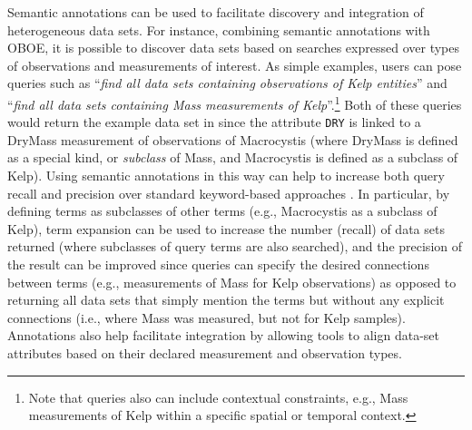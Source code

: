 Semantic annotations can be used to facilitate discovery and
integration of heterogeneous data sets. For instance, combining
semantic annotations with OBOE, it is possible to discover data sets
based on searches expressed over types of observations and
measurements of interest. As simple examples, users can pose queries
such as ``\emph{find all data sets containing observations of Kelp
  entities}'' and ``\emph{find all data sets containing Mass
  measurements of Kelp}''.\footnote{Note that queries also can include
  contextual constraints, e.g., Mass measurements of Kelp within a
  specific spatial or temporal context.} Both of these queries would
return the example data set in  since the
attribute {\tt DRY} is linked to a DryMass measurement of observations
of Macrocystis (where DryMass is defined as a special kind, or
\emph{subclass} of Mass, and Macrocystis is defined as a subclass of
Kelp). Using semantic annotations in this way can help to increase
both query recall and precision over standard keyword-based approaches
\cite{berkley09:_improv_data_discov_for_metad}. In particular, by
defining terms as subclasses of other terms (e.g., Macrocystis as a
subclass of Kelp), term expansion can be used to increase the number
(recall) of data sets returned (where subclasses of query terms are
also searched), and the precision of the result can be improved since
queries can specify the desired connections between terms (e.g.,
measurements of Mass for Kelp observations) as opposed to returning
all data sets that simply mention the terms but without any explicit
connections (i.e., where Mass was measured, but not for Kelp samples).
Annotations also help facilitate integration by allowing tools to
align data-set attributes based on their declared measurement and
observation types.


